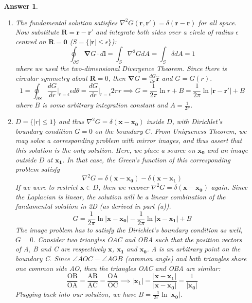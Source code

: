 \documentclass[a4paper]{article}
\newtheorem{ans}{Answer}[section]
\theoremstyle{new}
\begin{document}
\begin{ans}\leavevmode
\begin{enumerate}[label=(\alph*)]
\item The fundamental solution satisfies $\nabla^2G(\mathbf{r},\mathbf{r'})=\delta(\mathbf{r}-\mathbf{r})$ for all space. Now substitute $\mathbf{R}=\mathbf{r}-\mathbf{r'}$ and integrate both sides over a circle of radius $\epsilon$ centred on $\mathbf{R}=\boldsymbol{0}$ ($S=\{|\mathbf{r}|\leq\epsilon\}$):
$$\oint_{\partial S}\boldsymbol{\nabla}G\cdot d\mathbf{l}=\int_S\nabla^2GdA=\int_S\delta dA=1$$
where we used the two-dimensional Divergence Theorem. Since there is circular symmetry about $\mathbf{R}=0$, then $\boldsymbol{\nabla}G=\frac{dG}{dr}\mathbf{\hat{r}}$ and $G=G(r)$.
$$1=\oint_{\partial S}\frac{dG}{dr}\bigg|_{r=\epsilon}\epsilon d\theta=\frac{dG}{dr}\bigg|_{r=\epsilon}2\pi r\implies G=\frac{1}{2\pi}\ln r+B=\frac{1}{2\pi}\ln|\mathbf{r}-\mathbf{r'}|+B$$
where $B$ is some arbitrary integration constant and $A=\frac{1}{2\pi}$.
\item $D=\{|r|\leq 1\}$ and thus $\nabla^2G=\delta(\mathbf{x}-\mathbf{x_0})$ inside $D$, with Dirichlet's boundary condition $G=0$ on the boundary $C$. From Uniqueness Theorem, we may solve a corresponding problem with mirror images, and thus assert that this solution is the only solution. Here, we place a source on $\mathbf{x_0}$ and an image outside $D$ at $\mathbf{x_1}$. In that case, the Green's function of this corresponding problem satisfy
$$\nabla^2G=\delta(\mathbf{x}-\mathbf{x_0})-\delta(\mathbf{x}-\mathbf{x_1})$$
If we were to restrict $\mathbf{x}\in D$, then we recover $\nabla^2G=\delta(\mathbf{x}-\mathbf{x_0})$ again. Since the Laplacian is linear, the solution will be a linear combination of the fundamental solution in 2D (as derived in part (a)).
$$G=\frac{1}{2\pi}\ln|\mathbf{x}-\mathbf{x_0}|-\frac{1}{2\pi}\ln|\mathbf{x}-\mathbf{x_1}|+B$$
The image problem has to satisfy the Dirichlet's boundary condition as well, $G=0$.  Consider two triangles OAC and OBA such that the position vectors of A, B and C are respectively $\mathbf{x}$, $\mathbf{x_1}$ and $\mathbf{x_0}$. A is an arbitrary point on the boundary C. Since $\angle AOC=\angle AOB$ (common angle) and both triangles share one common side AO, then the triangles OAC and OBA are similar:
$$\frac{\text{OB}}{\text{OA}}=\frac{\text{AB}}{\text{AC}}=\frac{\text{OA}}{\text{OC}}\implies|\mathbf{x_1}|=\frac{|\mathbf{x}-\mathbf{x_1}|}{|\mathbf{x}-\mathbf{x_0}|}=\frac{1}{|\mathbf{x_0}|}$$
Plugging back into our solution, we have $B=\frac{-1}{2\pi}\ln|\mathbf{x_0}|$.

\end{enumerate}
\end{ans}
\end{document}
